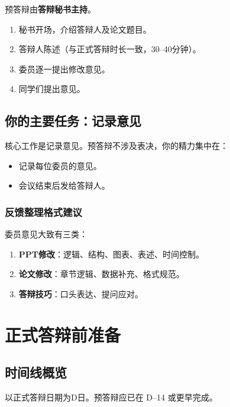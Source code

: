 \documentclass[12pt,a4paper,openany]{ctexbook}
\newcommand{\important}[1]{\textbf{\color{red}#1}}
\begin{document}
预答辩由\important{答辩秘书主持}。

\begin{enumerate}
  \item 秘书开场，介绍答辩人及论文题目。
  \item 答辩人陈述（与正式答辩时长一致，30--40分钟）。
  \item 委员逐一提出修改意见。
  \item 同学们提出意见。
\end{enumerate}

\section{你的主要任务：记录意见}

核心工作是记录意见。预答辩不涉及表决，你的精力集中在：

\begin{itemize}
  \item 记录每位委员的意见。
  \item 会议结束后发给答辩人。
\end{itemize}

\subsection{反馈整理格式建议}

委员意见大致有三类：

\begin{enumerate}
  \item \textbf{PPT修改}：逻辑、结构、图表、表述、时间控制。
  \item \textbf{论文修改}：章节逻辑、数据补充、格式规范。
  \item \textbf{答辩技巧}：口头表达、提问应对。
\end{enumerate}

\chapter{正式答辩前准备}

\section{时间线概览}

以正式答辩日期为D日。预答辩应已在 D--14 或更早完成。
\end{document}
